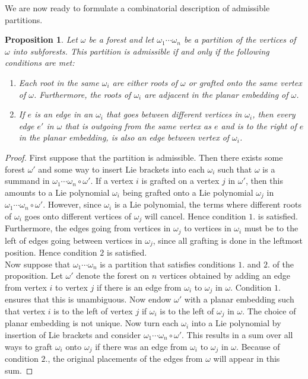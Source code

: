\documentclass[10pt,a4paper]{article}
\newtheorem{proposition}[theorem]{Proposition}
\begin{document}
We are now ready to formulate a combinatorial description of admissible partitions.

\begin{proposition} \label{prop::8}
Let $\omega$ be a forest and let $\omega_1 \cdots \omega_n$ be a partition of the vertices of $\omega$ into subforests. This partition is admissible if and only if the following conditions are met:
\begin{enumerate}
\item Each root in the same $\omega_i$ are either roots of $\omega$ or grafted onto the same vertex of $\omega$. Furthermore, the roots of $\omega_i$ are adjacent in the planar embedding of $\omega$.
\item If $e$ is an edge in an $\omega_i$ that goes between different vertices in $\omega_i$, then every edge $e'$ in $\omega$ that is outgoing from the same vertex as $e$ and is to the right of $e$ in the planar embedding, is also an edge between vertex of $\omega_i$.
\end{enumerate}
\end{proposition}

\begin{proof}
First suppose that the partition is admissible. Then there exists some forest $\omega'$ and some way to insert Lie brackets into each $\omega_i$ such that $\omega$ is a summand in $\omega_1 \cdots \omega_n \circ \omega'$. If a vertex $i$ is grafted on a vertex $j$ in $\omega'$, then this amounts to a Lie polynomial $\omega_i$ being grafted onto a Lie polynomial $\omega_j$ in $\omega_1 \cdots \omega_n \circ \omega'$. However, since $\omega_i$ is a Lie polynomial, the terms where different roots of $\omega_i$ goes onto different vertices of $\omega_j$ will cancel. Hence condition $1.$ is satisfied. Furthermore, the edges going from vertices in $\omega_j$ to vertices in $\omega_i$ must be to the left of edges going between vertices in $\omega_j$, since all grafting is done in the leftmost position. Hence condition $2$ is satisfied. \\
Now suppose that $\omega_1\cdots \omega_n$ is a partition that satisfies conditions $1.$ and $2.$ of the proposition. Let $\omega'$ denote the forest on $n$ vertices obtained by adding an edge from vertex $i$ to vertex $j$ if there is an edge from $\omega_i$ to $\omega_j$ in $\omega$. Condition $1.$ ensures that this is unambiguous. Now endow $\omega'$ with a planar embedding such that vertex $i$ is to the left of vertex $j$ if $\omega_i$ is to the left of $\omega_j$ in $\omega$. The choice of planar embedding is not unique. Now turn each $\omega_i$ into a Lie polynomial by insertion of Lie brackets and consider $\omega_1 \cdots \omega_n \circ \omega'$. This results in a sum over all ways to graft $\omega_i$ onto $\omega_j$ if there was an edge from $\omega_i$ to $\omega_j$ in $\omega$. Because of condition $2.$, the original placements of the edges from $\omega$ will appear in this sum.
\end{proof}
\end{document}
